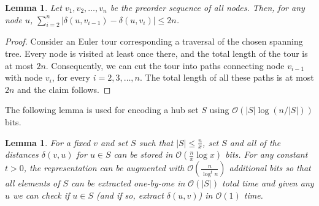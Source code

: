 \documentclass{article}[11pt,letter]
\newtheorem{lemma}[definition]{Lemma}
\newcommand{\bigo}{\mathcal{O}}
\newcommand{\cost}{\delta}
\begin{document}
\begin{lemma}
\label{lem:sum}
Let $v_1,v_2,\ldots,v_n$ be the preorder sequence of all nodes.
Then, for any node $u$, $\sum_{i=2}^{n}|\cost(u,v_{i-1})-\cost(u,v_i)|\leq 2n$.
\end{lemma}

\begin{proof}
Consider an Euler tour corresponding a traversal of the chosen spanning tree. Every node is visited at least
once there, and the total length of the tour is at most $2n$. Consequently, we can cut the tour
into paths connecting node $v_{i-1}$ with node $v_i$, for every $i=2,3,\ldots,n$. The total length
of all these paths is at most $2n$ and the claim follows.
\end{proof}

The following lemma is used for encoding a hub set $S$ using $\bigo(|S| \log (n/|S|))$ bits.

\begin{lemma}
\label{lem:set_encoding}
For a fixed $v$ and set $S$ such that $|S| \le \frac{n}{x}$, set $S$ and all of the distances $\cost(v,u)$ for $u \in S$ can be stored in $\bigo(\frac{n}{x} \log x)$ bits. For any constant $t>0$, the representation
can be augmented with $\bigo(\frac{n}{\log^t n})$ additional bits so that all elements of $S$ can
be extracted one-by-one in $\bigo(|S|)$ total time and given any $u$ we can check if $u\in S$
(and if so, extract $\cost(u,v)$) in $\bigo(1)$ time.
\end{lemma}
\end{document}
